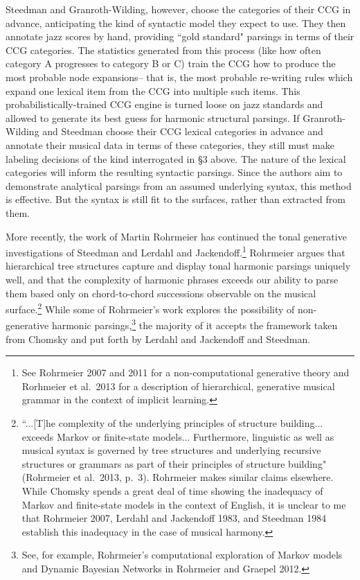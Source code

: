 Steedman and Granroth-Wilding, however, choose the categories of their CCG in advance, anticipating the kind of syntactic model they expect to use.  They then annotate jazz scores by hand, providing ``gold standard" parsings in terms of their CCG categories.  The statistics generated from this process (like how often category A progresses to category B or C) train the CCG how to produce the most probable node expansions-- that is, the most probable re-writing rules which expand one lexical item from the CCG into multiple such items.  This probabilistically-trained CCG engine is turned loose on jazz standards and allowed to generate its best guess for harmonic structural parsings.  If Granroth-Wilding and Steedman choose their CCG lexical categories in advance and annotate their musical data in terms of these categories, they still must make labeling decisions of the kind interrogated in \S 3 above.  The nature of the lexical categories will inform the resulting syntactic parsings.  Since the authors aim to demonstrate analytical parsings from an assumed underlying syntax, this method is effective.  But the syntax is still fit to the surfaces, rather than extracted from them.

More recently, the work of Martin Rohrmeier has continued the tonal generative investigations of Steedman and Lerdahl and Jackendoff.\footnote{See Rohrmeier 2007 and 2011 for a non-computational generative theory and Rorhmeier et al.\ 2013 for a description of hierarchical, generative musical grammar in the context of implicit learning.}  Rohrmeier argues that hierarchical tree structures capture and display tonal harmonic parsings uniquely well, and that the complexity of harmonic phrases exceeds our ability to parse them based only on chord-to-chord successions observable on the musical surface.\footnote{``...[T]he complexity of the underlying principles of structure building... exceeds Markov or finite-state models... Furthermore, linguistic as well as musical syntax is governed by tree structures and underlying recursive structures or grammars as part of their principles of structure building" (Rohrmeier et al.\ 2013, p.\ 3).  Rohrmeier makes similar claims elsewhere.  While Chomsky spends a great deal of time showing the inadequacy of Markov and finite-state models in the context of English, it is unclear to me that Rohrmeier 2007, Lerdahl and Jackendoff 1983, and Steedman 1984 establish this inadequacy in the case of musical harmony.}  While some of Rohrmeier's work explores the possibility of non-generative harmonic parsings,\footnote{See, for example, Rohrmeier's computational exploration of Markov models and Dynamic Bayesian Networks in Rohrmeier and Graepel 2012.} the majority of it accepts the framework taken from Chomsky and put forth by Lerdahl and Jackendoff and Steedman.

